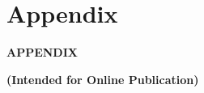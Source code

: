 \documentclass[11pt, a4paper]{article} %
\begin{document}
\newpage





\newpage
\TODO\section{Appendix}
\vspace*{\fill}
{\Huge \begin{center}\textbf{APPENDIX}\end{center}}
{\huge\begin{center}\textbf{(Intended for Online Publication)}\end{center}}
\vspace*{\fill}\clearpage
\end{document}
